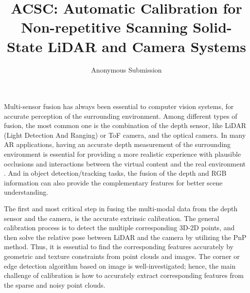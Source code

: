 \documentclass[journal]{vgtc}
\title{ACSC: Automatic Calibration for Non-repetitive Scanning Solid-State LiDAR and Camera Systems}
\author{Anonymous Submission}
\begin{document}


\maketitle


Multi-sensor fusion has always been essential to computer vision systems, for accurate perception of the surrounding environment. Among different types of fusion, the most common one is the combination of the depth sensor, like LiDAR (Light Detection And Ranging) or ToF camera, and the optical camera. In many AR applications, having an accurate depth measurement of the surrounding environment is essential for providing a more realistic experience with plausible occlusions and interactions between the virtual content and the real environment \cite{wu2019tangible, newcombe2011kinectfusion}. And in object detection/tracking tasks, the fusion of the depth and RGB information can also provide the complementary features for better scene understanding\cite{qi2020imvotenet, ouyang2018multiview, jaritz2020xmuda}. 

The first and most critical step in fusing the multi-modal data from the depth sensor and the camera, is the accurate extrinsic calibration. The general calibration process is to detect the multiple corresponding 3D-2D points, and then solve the relative pose between LiDAR and the camera by utilizing the PnP method. Thus, it is essential to find the corresponding features accurately by geometric and texture constraints from point clouds and images. The corner or edge detection algorithm based on image is well-investigated\cite{duda2018accurate, de2010automatic, liu2016automatic}; hence, the main challenge of calibration is how to accurately extract corresponding features from the sparse and noisy point clouds.



\end{document}
